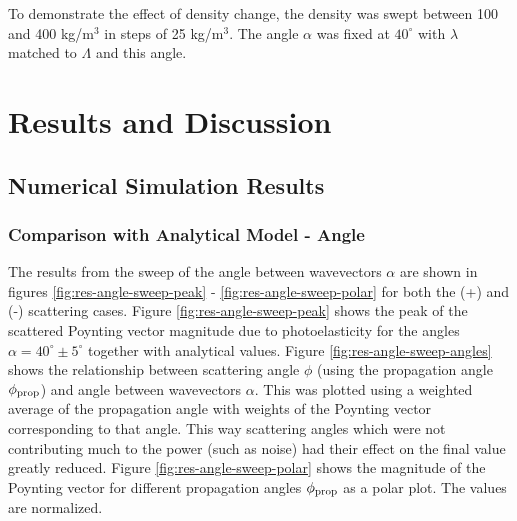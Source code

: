 \documentclass[11pt,twoside]{eitExjobb}
\begin{document}
	To demonstrate the effect of density change, the density was swept between 100 and 400 kg/m$^3$ in steps of 25 kg/m$^3$. The angle $\alpha$ was fixed at $40^\circ$ with $\lambda$ matched to $\Lambda$ and this angle.
	
	\chapter{Results and Discussion}
	
	\section{Numerical Simulation Results}
	
	\subsection{Comparison with Analytical Model - Angle}
	The results from the sweep of the angle between wavevectors $\alpha$ are shown in figures \ref{fig:res-angle-sweep-peak} - \ref{fig:res-angle-sweep-polar} for both the (+) and (-) scattering cases. Figure \ref{fig:res-angle-sweep-peak} shows the peak of the scattered Poynting vector magnitude due to photoelasticity for the angles $\alpha = 40^\circ \pm 5^\circ$ together with analytical values. Figure \ref{fig:res-angle-sweep-angles} shows the relationship between scattering angle $\phi$ (using the propagation angle $\phi_{\mathrm{prop}}$) and angle between wavevectors $\alpha$. This was plotted using a weighted average of the propagation angle with weights of the Poynting vector corresponding to that angle. This way scattering angles which were not contributing much to the power (such as noise) had their effect on the final value greatly reduced. Figure \ref{fig:res-angle-sweep-polar} shows the magnitude of the Poynting vector for different propagation angles $\phi_{\mathrm{prop}}$ as a polar plot. The values are normalized.
	
\end{document}
